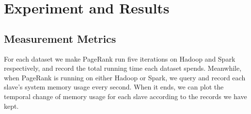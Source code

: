 \documentclass[10pt,conference,compsocconf]{IEEEtran}
\begin{document}




\section{Experiment and Results}
\label{sec:results}


\subsection{Measurement Metrics}
For each dataset we make PageRank run five iterations on Hadoop and Spark respectively, and record the total running time each dataset spends. Meanwhile, when PageRank is running on either Hadoop or Spark, we query and record each slave's system memory usage every second. When it ends, we can plot the temporal change of memory usage for each slave according to the records we have kept.
\end{document}
